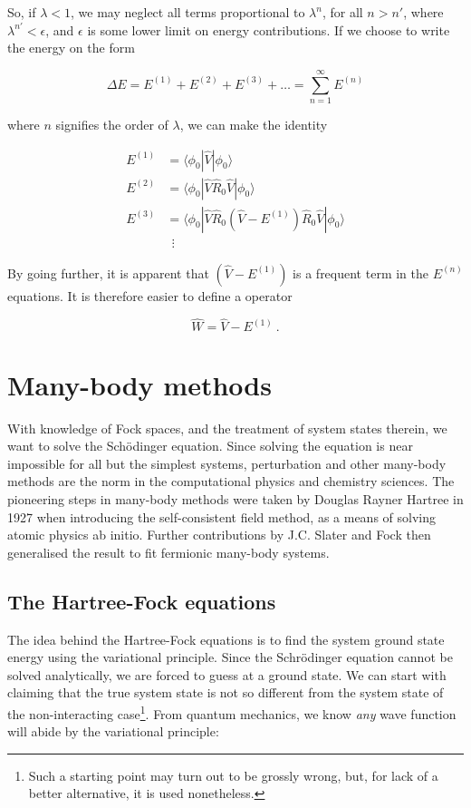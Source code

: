 \documentclass[10pt,twoside]{report}
\begin{document}
	So, if $\lambda < 1$, we may neglect all terms proportional to $\lambda^n$, for all $n>n'$, where $\lambda^{n'} < \epsilon$, and $\epsilon$ is some lower limit on energy contributions. If we choose to write the energy on the form
	
	\begin{equation}
		\Delta E = E^{(1)} + E^{(2)} + E^{(3)} + \ldots = \sum_{n=1}^\infty E^{(n)}
	\end{equation}
	
	\noindent where $n$ signifies the order of $\lambda$, we can make the identity
	
	\begin{align}
		E^{(1)} &= \langle\phi_0|\hat{V}|\phi_0\rangle\\
		E^{(2)} &= \langle\phi_0|\hat{V}\hat{R}_0\hat{V}|\phi_0\rangle\\
		E^{(3)} &= \langle\phi_0|\hat{V}\hat{R}_0(\hat{V}-E^{(1)})\hat{R}_0\hat{V}|\phi_0\rangle\\
		&\:\:\vdots
	\end{align}
	
	By going further, it is apparent that $(\hat{V}-E^{(1)})$ is a frequent term in the $E^{(n)}$ equations. It is therefore easier to define a operator
	
	\begin{equation}
		\hat{W} = \hat{V}-E^{(1)} \:.
	\end{equation}
	
	\section{Many-body methods}
	With knowledge of Fock spaces, and the treatment of system states therein, we want to solve the Sch\"odinger equation. Since solving the equation is near impossible for all but the simplest systems, perturbation and other many-body methods are the norm in the computational physics and chemistry sciences. The pioneering steps in many-body methods were taken by Douglas Rayner Hartree in 1927 when introducing the self-consistent field method, as a means of solving atomic physics ab initio. Further contributions by J.C. Slater  and Fock then generalised the result to fit fermionic many-body systems.
	
	\subsection{The Hartree-Fock equations}
	The idea behind the Hartree-Fock equations is to find the system ground state energy using the variational principle. Since the Schr\"odinger equation cannot be solved analytically, we are forced to guess at a ground state. We can start with claiming that the true system state is not so different from the system state of the non-interacting case\footnote{Such a starting point may turn out to be grossly wrong, but, for lack of a better alternative, it is used nonetheless.}. From quantum mechanics, we know \emph{any} wave function will abide by the variational principle:
	
\end{document}
